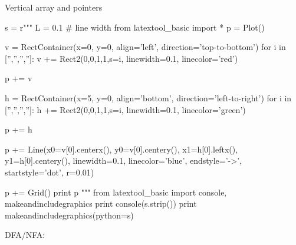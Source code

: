 \begin{samepage}
Vertical array and pointers
\begin{python}
s = r"""
L = 0.1 # line width
from latextool_basic import *
p = Plot()


v = RectContainer(x=0, y=0, align='left', direction='top-to-bottom')
for i in ['','','','']:
    v += Rect2(0,0,1,1,s=i, linewidth=0.1, linecolor='red')

p += v

h = RectContainer(x=5, y=0, align='bottom', direction='left-to-right')
for i in ['','','','']:
    h += Rect2(0,0,1,1,s=i, linewidth=0.1, linecolor='green')

p += h

p += Line(x0=v[0].centerx(), y0=v[0].centery(),
          x1=h[0].leftx(), y1=h[0].centery(),
          linewidth=0.1, linecolor='blue',
          endstyle='->', startstyle='dot', r=0.01)

p += Grid()
print p
"""
from latextool_basic import console, makeandincludegraphics
print console(s.strip())
print makeandincludegraphics(python=s)
\end{python}
\end{samepage}





\begin{samepage}
DFA/NFA:
\end{samepage}




